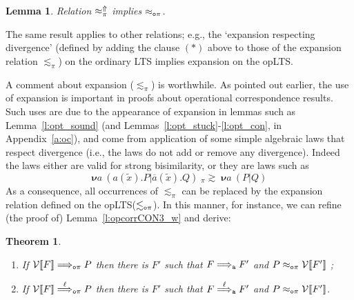 \documentclass[11pt,a4paper]{amsart}
\theoremstyle{plain}
\theoremstyle{definition}
\theoremstyle{defC}
\theoremstyle{thmC}
\theoremstyle{plain}
\numberwithin{equation}{section}
\def\res#1{{\boldsymbol \nu} #1\:}   %
\def\inp#1#2{#1(#2)}
\def\bout#1#2{\overline{#1}(#2)}   %
\newcommand{\rmm}[1]{{\tt{\lowercase{#1}}}}
\newcommand{\genarr}[2]{\mathrel{\stackrel{{#1}}{\longrightarrow}_{\rmm{\lowercase{#2}}}}}
\newcommand{\genArr}[2]{\mathrel{\stackrel{{#1}}{\Longrightarrow}_{\rmm{\lowercase{#2}}}}}  %
\newcommand{\genLongrightarrow}[1]{\mathrel{\Longrightarrow_{\rmm{\lowercase{#1}}}}}
\newcommand{\ArrA}[1]{\genArr{#1}{A}}  %
\newcommand{\LongrightarrowA}{\genLongrightarrow{A}}
\newcommand{\arrN}[1]{\genarr{#1}{o\pi}}  %
\newcommand{\ArrN}[1]{\genArr{#1}{o\pi}}  %
\newcommand{\arr}[1]{\mathrel{\stackrel{{#1}}{\longrightarrow}}}  %
\newcommand{\opLTS}{opLTS\xspace}  %
\newcommand{\genwb}[1]{\mathrel{\approx_{\rmm{\lowercase{#1}}}}}       %
\newcommand{\wbOPI}{\genwb{o\pi}}       %
\newcommand{\genwbDIV}[2]{\mathrel{\approx^{#2}_{\rmm{\lowercase{#1}}}}}
\newcommand{\wbPIDIV}{\genwbDIV{\pi}{\Uparrow}}       %
\newcommand{\contr}{\mathrel{\mbox{}_{\pi}\!\!\gtrsim}}
\newcommand{\expa}{\mathrel{\lesssim_{\pi}}}
\newcommand{\expaOP}{\mathrel{\lesssim_{\rmm{o}\pi}}} %
\newcommand{\tilx}{\tilde{x}}
\newcommand{\FF}{F}
\newcommand{\PP}{P}
\newcommand{\cbvSymb}{{\mathcal {V}}}
\newcommand{\encoEnvI}[1]{ \cbvSymb[\! [ #1 ] \! ]  } %
\newcommand{\encoConI}{\encoEnvI} %
\newcommand{\encoEnvV}[1]{{\mathcal {O}} [\! [ #1 ] \! ]  } %
\newcommand{\encoConV}{\encoEnvV} %
\newcommand{\Intp}{\mbox{I$\pi$}\xspace}   %
\newcommand{\piI}{\Intp}   %
\newcommand{\initName}{}
\theoremstyle{plain}
\newtheorem{theorem}[thm]{Theorem}
\newtheorem{lemma}[thm]{Lemma}
\theoremstyle{definition}
\begin{document}
\begin{lemma}
\label{l:bisDIV_op}
Relation $\wbPIDIV$ implies $\wbOPI$.
\end{lemma} 
\noindent
The same result applies to  other relations; e.g., the `expansion  respecting divergence'
(defined by adding the clause $(*)$ above to those of the expansion
relation $\expa$)
 on the ordinary LTS implies expansion  on the \opLTS.

A comment about expansion ($\expa$) is worthwhile. 
As pointed out earlier,   the use of expansion
is important in proofs  about operational correspondence results. 
Such uses are  due to 
the appearance of expansion in 
 lemmas such as  
 Lemma~\ref{l:opt_sound} (and Lemmas~\ref{l:opt_stuck}-\ref{l:opt_con}, in
 Appendix~\ref{a:oc}),
 and
come from application of some
simple algebraic laws that respect  divergence (i.e., the laws do not add or remove any
divergence). Indeed the laws either are valid for strong bisimilarity, or they are laws
such as 
\[ 
{\res{a} ( \inp a {\tilx}.P | \bout a \tilx . Q)} \;  \contr \;
{\res{a} (P |  Q)  }
 \]
As a consequence, all occurrences of $\expa$ 
can be replaced by the expansion relation defined on the \opLTS ($\expaOP$). 
In this manner, for instance, we can   refine (the proof of)  Lemma~\ref{l:opcorrCON3_w}
and derive: 


 \begin{theorem} %
 \label{t:opcorrCON3_w}
$ $ \begin{enumerate}


\item If 
$ \encoConI \FF \ArrN {} \PP$ then there is $\FF'$ such that 
$\FF \LongrightarrowA \FF'$  and  
$\PP  \wbOPI 
 \encoConI {\FF'}$ ; 


\item If
$ \encoConI \FF \ArrN\ell \PP$
 then there is $\FF'$ such that
 $\FF \ArrA\ell \FF'$
and $\PP \wbOPI \encoConI {\FF'}$.
\end{enumerate} 
\end{theorem} 
\end{document}
